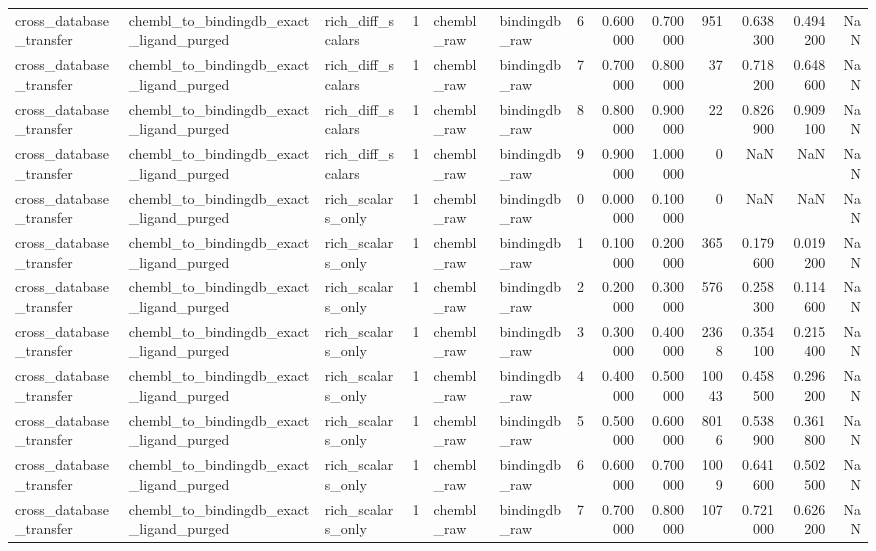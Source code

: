 \begin{longtable}{lllrllrrrrrrr}
cross\_database\_transfer & chembl\_to\_bindingdb\_exact\_ligand\_purged & rich\_diff\_scalars & 1 & chembl\_raw & bindingdb\_raw & 6 & 0.600000 & 0.700000 & 951 & 0.638300 & 0.494200 & NaN \\
cross\_database\_transfer & chembl\_to\_bindingdb\_exact\_ligand\_purged & rich\_diff\_scalars & 1 & chembl\_raw & bindingdb\_raw & 7 & 0.700000 & 0.800000 & 37 & 0.718200 & 0.648600 & NaN \\
cross\_database\_transfer & chembl\_to\_bindingdb\_exact\_ligand\_purged & rich\_diff\_scalars & 1 & chembl\_raw & bindingdb\_raw & 8 & 0.800000 & 0.900000 & 22 & 0.826900 & 0.909100 & NaN \\
cross\_database\_transfer & chembl\_to\_bindingdb\_exact\_ligand\_purged & rich\_diff\_scalars & 1 & chembl\_raw & bindingdb\_raw & 9 & 0.900000 & 1.000000 & 0 & NaN & NaN & NaN \\
cross\_database\_transfer & chembl\_to\_bindingdb\_exact\_ligand\_purged & rich\_scalars\_only & 1 & chembl\_raw & bindingdb\_raw & 0 & 0.000000 & 0.100000 & 0 & NaN & NaN & NaN \\
cross\_database\_transfer & chembl\_to\_bindingdb\_exact\_ligand\_purged & rich\_scalars\_only & 1 & chembl\_raw & bindingdb\_raw & 1 & 0.100000 & 0.200000 & 365 & 0.179600 & 0.019200 & NaN \\
cross\_database\_transfer & chembl\_to\_bindingdb\_exact\_ligand\_purged & rich\_scalars\_only & 1 & chembl\_raw & bindingdb\_raw & 2 & 0.200000 & 0.300000 & 576 & 0.258300 & 0.114600 & NaN \\
cross\_database\_transfer & chembl\_to\_bindingdb\_exact\_ligand\_purged & rich\_scalars\_only & 1 & chembl\_raw & bindingdb\_raw & 3 & 0.300000 & 0.400000 & 2368 & 0.354100 & 0.215400 & NaN \\
cross\_database\_transfer & chembl\_to\_bindingdb\_exact\_ligand\_purged & rich\_scalars\_only & 1 & chembl\_raw & bindingdb\_raw & 4 & 0.400000 & 0.500000 & 10043 & 0.458500 & 0.296200 & NaN \\
cross\_database\_transfer & chembl\_to\_bindingdb\_exact\_ligand\_purged & rich\_scalars\_only & 1 & chembl\_raw & bindingdb\_raw & 5 & 0.500000 & 0.600000 & 8016 & 0.538900 & 0.361800 & NaN \\
cross\_database\_transfer & chembl\_to\_bindingdb\_exact\_ligand\_purged & rich\_scalars\_only & 1 & chembl\_raw & bindingdb\_raw & 6 & 0.600000 & 0.700000 & 1009 & 0.641600 & 0.502500 & NaN \\
cross\_database\_transfer & chembl\_to\_bindingdb\_exact\_ligand\_purged & rich\_scalars\_only & 1 & chembl\_raw & bindingdb\_raw & 7 & 0.700000 & 0.800000 & 107 & 0.721000 & 0.626200 & NaN \\

\end{longtable}
